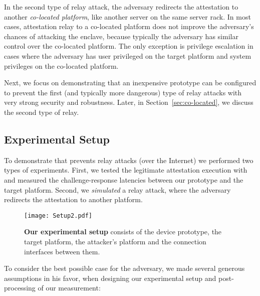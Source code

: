 In the second type of relay attack, the adversary redirects the attestation to another \emph{co-located platform}, like another server on the same server rack. In most cases, attestation relay to a co-located platform does not improve the adversary's chances of attacking the enclave, because typically the adversary has similar control over the co-located platform. The only exception is privilege escalation in cases where the adversary has user privileged on the target platform and system privileges on the co-located platform. 

Next, we focus on demonstrating that an inexpensive \name prototype can be configured to prevent the first (and typically more dangerous) type of relay attacks with very strong security and robustness. Later, in Section~\ref{sec:co-located}, we discuss the second type of relay.


\subsection{Experimental Setup}
\label{sec:evaluation:exp}

To demonstrate that \name prevents relay attacks (over the Internet) we performed two types of experiments. First, we tested the legitimate attestation execution with \name and measured the challenge-response latencies between our prototype and the target platform. Second, we \emph{simulated} a relay attack, where the adversary redirects the attestation to another platform.

\begin{figure}[t]
  \centering
    \texttt{[image: Setup2.pdf]}
    \caption{\textbf{Our experimental setup} consists of the \device device prototype, the target platform, the attacker's platform and the connection interfaces between them.}
   \figsaver
    \label{fig:setup}
\end{figure}

To consider the best possible case for the adversary, we made several generous assumptions in his favor, when designing our experimental setup and post-processing of our measurement:


